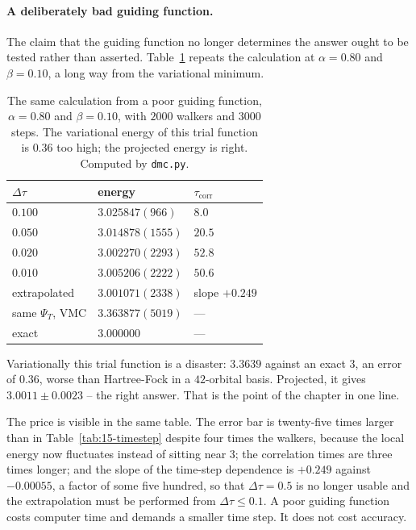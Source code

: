 \paragraph{A deliberately bad guiding function.}
The claim that the guiding function no longer determines the answer ought to
be tested rather than asserted.  Table~\ref{tab:15-poorguide} repeats the
calculation at $\alpha=0.80$ and $\beta=0.10$, a long way from the variational
minimum.

\begin{table}[h]
\centering
\renewcommand{\arraystretch}{1.2}
\setlength{\tabcolsep}{14pt}
\begin{tabular}{lll}
\toprule
$\Delta\tau$ & energy & $\tau_{\mathrm{corr}}$\\
\midrule
$0.100$ & $3.025847(966)$ & $8.0$\\
$0.050$ & $3.014878(1555)$ & $20.5$\\
$0.020$ & $3.002270(2293)$ & $52.8$\\
$0.010$ & $3.005206(2222)$ & $50.6$\\
\midrule
extrapolated & $3.001071(2338)$ & slope $+0.249$\\
\midrule
same $\Psi_T$, VMC & $3.363877(5019)$ & ---\\
exact & $3.000000$ & ---\\
\bottomrule
\end{tabular}
\caption{The same calculation from a poor guiding function, $\alpha=0.80$ and
$\beta=0.10$, with $2000$ walkers and $3000$ steps.  The variational energy of
this trial function is $0.36$ too high; the projected energy is right.
Computed by \texttt{dmc.py}.}
\label{tab:15-poorguide}
\end{table}

Variationally this trial function is a disaster: $3.3639$ against an exact
$3$, an error of $0.36$, worse than Hartree-Fock in a $42$-orbital basis.
Projected, it gives $3.0011\pm0.0023$ -- the right answer.  That is the point
of the chapter in one line.

The price is visible in the same table.  The error bar is twenty-five times
larger than in Table~\ref{tab:15-timestep} despite four times the walkers,
because the local energy now fluctuates instead of sitting near $3$; the
correlation times are three times longer; and the slope of the time-step
dependence is $+0.249$ against $-0.00055$, a factor of some five hundred, so
that $\Delta\tau=0.5$ is no longer usable and the extrapolation must be
performed from $\Delta\tau\le0.1$.  A poor guiding function costs computer
time and demands a smaller time step.  It does not cost accuracy.

